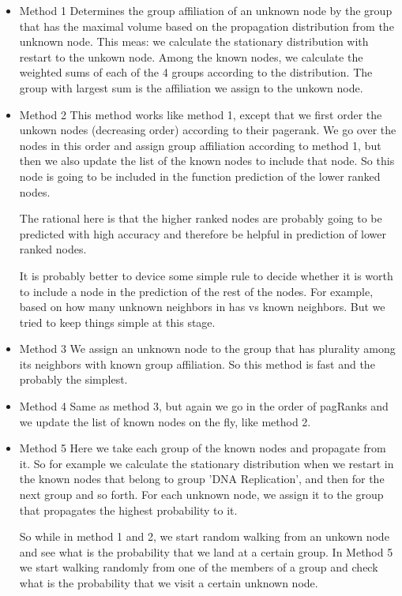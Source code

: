 \documentclass[a4paper,10pt]{article}
\theoremstyle{definition}
\theoremstyle{remark}
\theoremstyle{plain}
\begin{document}
\begin{itemize}
\item{Method 1} Determines the group affiliation of an unknown node by the group
that has the maximal volume based on the propagation distribution from the
unknown node. This meas: we calculate the stationary distribution with restart
to the unkown node. Among the known nodes, we calculate the weighted sums of
each of the 4 groups according to the distribution. The group with largest sum
is the affiliation we assign to the unkown node.

\item{Method 2} This method works like method 1, except that we first order the
unkown nodes (decreasing order) according to their pagerank. We go over the
nodes in this order and assign group affiliation according to method 1, but then
we also update the list of the known nodes to include that node. So this node is
going to be included in the function prediction of the lower ranked nodes.

The rational here is that the higher ranked nodes are probably going to be
predicted with high accuracy and therefore be helpful in prediction of lower
ranked nodes. 

It is probably better to device some simple rule to decide whether it is worth
to include a node in the prediction of the rest of the nodes. For example, based
on how many unknown neighbors in has vs known neighbors. But we tried to keep
things simple at this stage.

\item{Method 3} We assign an unknown node to the group that has plurality among
its neighbors with known group affiliation. So this method is fast and the
probably the simplest.

\item{Method 4} Same as method 3, but again we go in the order of pagRanks and
we update the list of known nodes on the fly, like method 2.

\item{Method 5} Here we take each group of the known nodes and propagate from
it. So for example we calculate the stationary distribution when we restart in
the known nodes that belong to group 'DNA Replication', and then for the next
group and so forth. For each unknown node, we assign it to the group that
propagates the highest probability to it.

So while in method 1 and 2, we start random walking from an unkown node and see
what is the probability that we land at a certain group. In Method 5 we start
walking randomly from one of the members of a group and check what is the
probability that we visit a certain unknown node.

\end{itemize}
\end{document}

